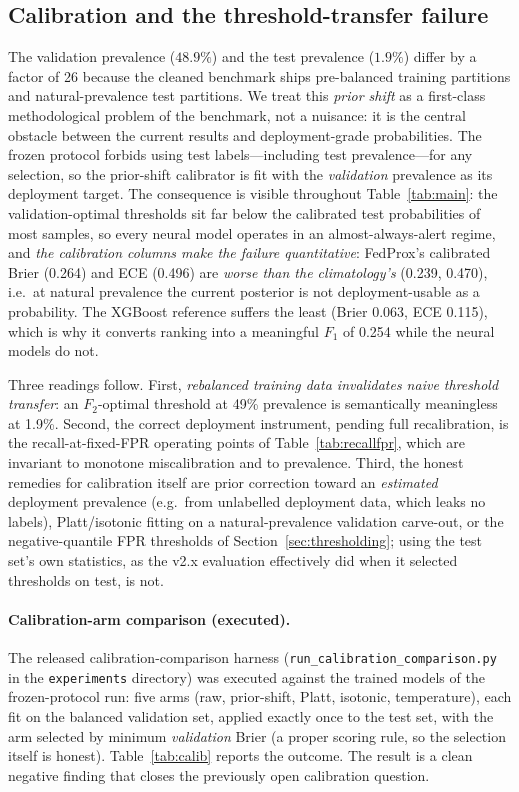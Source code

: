\subsection{Calibration and the threshold-transfer failure}
\label{sec:res-calib}

The validation prevalence ($48.9\%$) and the test prevalence ($1.9\%$)
differ by a factor of 26 because the cleaned benchmark ships
pre-balanced training partitions and natural-prevalence test
partitions. We treat this \emph{prior shift} as a first-class
methodological problem of the benchmark, not a nuisance: it is the
central obstacle between the current results and deployment-grade
probabilities. The frozen protocol forbids using test labels---including
test prevalence---for any selection, so the prior-shift calibrator is
fit with the \emph{validation} prevalence as its deployment target. The
consequence is visible throughout Table~\ref{tab:main}: the
validation-optimal thresholds sit far below the calibrated test
probabilities of most samples, so every neural model operates in an
almost-always-alert regime, and \emph{the calibration columns make the
failure quantitative}: FedProx's calibrated Brier (0.264) and ECE
(0.496) are \emph{worse than the climatology's} (0.239, 0.470), i.e.\ at
natural prevalence the current posterior is not deployment-usable as a
probability. The XGBoost reference suffers the least (Brier 0.063, ECE
0.115), which is why it converts ranking into a meaningful $F_1$ of
0.254 while the neural models do not.

Three readings follow. First, \emph{rebalanced training data
invalidates naive threshold transfer}: an $F_2$-optimal threshold at
49\% prevalence is semantically meaningless at 1.9\%. Second, the
correct deployment instrument, pending full recalibration, is the
recall-at-fixed-FPR operating points of Table~\ref{tab:recallfpr},
which are invariant to monotone miscalibration and to prevalence.
Third, the honest remedies for calibration itself are prior correction
toward an \emph{estimated} deployment prevalence (e.g.\ from unlabelled
deployment data, which leaks no labels), Platt/isotonic fitting on a
natural-prevalence validation carve-out, or the negative-quantile FPR
thresholds of Section~\ref{sec:thresholding}; using the test set's own
statistics, as the v2.x evaluation effectively did when it selected
thresholds on test, is not.

\paragraph{Calibration-arm comparison (executed).}
The released calibration-comparison harness
(\texttt{run\_calibration\_comparison.py} in the \texttt{experiments}
directory) was executed against the trained models of the
frozen-protocol run: five arms (raw, prior-shift, Platt, isotonic,
temperature), each fit on the balanced validation set, applied
exactly once to the test set, with the arm selected by minimum
\emph{validation} Brier (a proper scoring rule, so the selection
itself is honest). Table~\ref{tab:calib} reports the outcome. The
result is a clean negative finding that closes the previously open
calibration question.

